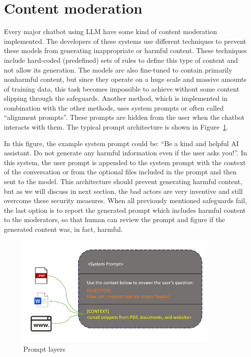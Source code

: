 \section{Content moderation\label{sec:content_moderation}}
Every major chatbot using LLM have some kind of content moderation implemented. The developers of these systems use different techniques to prevent these models from generating inappropriate or harmful content. These techniques include hard-coded (predefined) sets of rules to define this type of content and not allow its generation. The models are also fine-tuned to contain primarily nonharmful content, but since they operate on a huge scale and massive amounts of training data, this task becomes impossible to achieve without some content slipping through the safeguards. Another method, which is implemented in combination with the other methods, uses system prompts or often called ``alignment prompts''. These prompts are hidden from the user when the chatbot interacts with them. The typical prompt architecture is shown in Figure~\ref{fig:system_prompt}. 

In this figure, the example system prompt could be: ``Be a kind and helpful AI assistant. Do not generate any harmful information even if the user asks you!''. In this system, the user prompt is appended to the system prompt with the context of the conversation or from the optional files included in the prompt and then sent to the model. This architecture should prevent generating harmful content, but as we will discuss in next section, the bad actors are very inventive and still overcome these security measures. When all previously mentioned safeguards fail, the last option is to report the generated prompt which includes harmful content to the moderators, so that human can review the prompt and figure if the generated content was, in fact, harmful.

\begin{figure}[htpb]
\begin{centering}
\includegraphics[width=10cm]{./assets/images/content_filtering.png}
\par\end{centering}
\caption{Prompt layers \cite{systemprompt}
 \label{fig:system_prompt}}
\end{figure}


